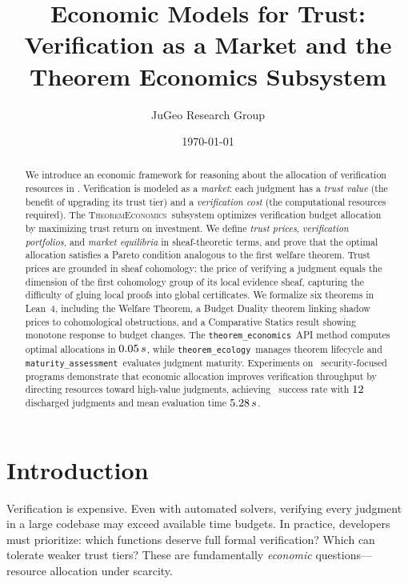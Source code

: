 \documentclass[11pt]{article}
\title{\textbf{Economic Models for Trust:\\
Verification as a Market and the Theorem Economics Subsystem}}
\author{%
  JuGeo Research Group
}
\date{\today}
\newcommand{\TheoremEcon}{\textsc{TheoremEconomics}}
\newcommand{\ThmEcon}{\texttt{theorem\_economics}}
\newcommand{\ThmEcol}{\texttt{theorem\_ecology}}
\newcommand{\MatAssess}{\texttt{maturity\_assessment}}
\begin{document}
\maketitle

\begin{abstract}
We introduce an economic framework for reasoning about the allocation
of verification resources in \JuGeo.  Verification is modeled as a
\emph{market}: each judgment has a \emph{trust value} (the benefit of
upgrading its trust tier) and a \emph{verification cost} (the
computational resources required).  The \TheoremEcon\ subsystem
optimizes verification budget allocation by maximizing trust return on
investment.  We define \emph{trust prices}, \emph{verification
portfolios}, and \emph{market equilibria} in sheaf-theoretic terms,
and prove that the optimal allocation satisfies a Pareto condition
analogous to the first welfare theorem.  Trust prices are grounded in
sheaf cohomology: the price of verifying a judgment equals the
dimension of the first cohomology group of its local evidence sheaf,
capturing the difficulty of gluing local proofs into global
certificates.  We formalize six theorems in Lean~4, including the
Welfare Theorem, a Budget Duality theorem linking shadow prices to
cohomological obstructions, and a Comparative Statics result showing
monotone response to budget changes.  The \ThmEcon\ API method
computes optimal allocations in $0.05\,s$, while
\ThmEcol\ manages theorem lifecycle and \MatAssess\ evaluates judgment
maturity.  Experiments on \ppLVtotalPrograms\ security-focused programs demonstrate that
economic allocation improves verification throughput by directing
resources toward high-value judgments, achieving \ppLVsuccessRate\
success rate with $12$ discharged judgments
and mean evaluation time $5.28\,s$.
\end{abstract}

\newpage

\section{Introduction}\label{sec:intro}

Verification is expensive.  Even with automated solvers, verifying
every judgment in a large codebase may exceed available time budgets.
In practice, developers must prioritize: which functions deserve full
formal verification?  Which can tolerate weaker trust tiers?  These
are fundamentally \emph{economic} questions---resource allocation
under scarcity.
\end{document}
